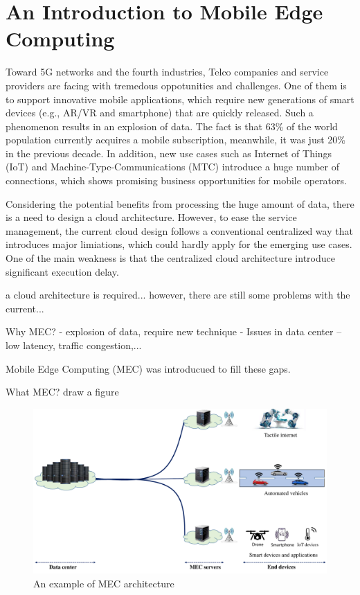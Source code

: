 \section{An Introduction to Mobile Edge Computing}  \label{intro}


Toward 5G networks and the fourth industries, Telco companies and service providers are facing with tremedous oppotunities and challenges. One of them is to support innovative mobile applications, which require new generations of smart devices (e.g., AR/VR and smartphone) that are quickly released. Such a phenomenon results in an explosion of data. The fact is that 63\% of the world population currently acquires a mobile subscription, meanwhile, it was just 20\% in the previous decade. In addition, new use cases such as Internet of Things (IoT) and Machine-Type-Communications (MTC) introduce a huge number of connections, which shows promising business opportunities for mobile operators.

Considering the potential benefits from processing the huge amount of data, there is a need to design a cloud architecture. However, to ease the service management, the current cloud design follows a conventional centralized way that introduces major limiations, which could hardly apply for the emerging use cases. One of the main weakness is that the centralized cloud architecture introduce significant execution delay.

a cloud architecture is required... however, there are still some problems with the current...


Why MEC? 
  - explosion of data, require new technique
  - Issues in data center -- low latency, traffic congestion,...

Mobile Edge Computing (MEC) was introducued to fill these gaps.

What MEC? draw a figure


\begin{figure}[H]
  \begin{center}
   \includegraphics[width=13cm]{./figures/mec-arch.pdf}
   \caption{An example of MEC architecture}
   \label{fig:mec-arch}
   \end{center}
\end{figure}
